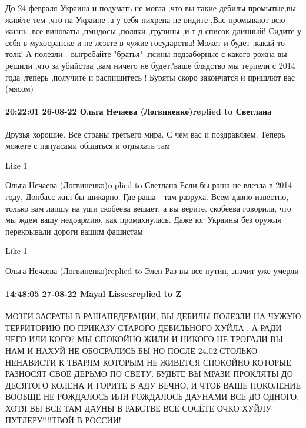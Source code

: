 До 24 февраля Украина и подумать не могла ,что вы такие дебилы промытые,вы
живёте тем ,что на Украине ,а у себя нихрена не видите ,Вас промывают всю жизнь
,все виноваты ,пмндосы ,поляки ,грузины ,и т д список длинный! Сидите у себя в
мухосранске и не лезьте в чужие государства! Может и будет ,какай то толк! А
полезли - выгребайте "братья" ,псины подзаборные с какого рожна вы решили ,что
за убийства ,вам ничего не будет?ваше блядство мы терпели с 2014 года ,теперь
,получите и распишитесь ! Буряты скоро закончатся и пришлют вас (мясом)


\paragraph{20:22:01 26-08-22 Ольга Нечаева (Логвиненко)replied to Светлана}

Друзья хорошие. Все страны третьего мира. С чем вас и поздравляем. Теперь
можете с папуасами общаться и отдыхать там

    Like 1

Ольга Нечаева (Логвиненко)replied to Светлана
Если бы раша не влезла в 2014 году, Донбасс жил бы шикарно. Где раша - там разруха. Всем давно известно, только вам лапшу на уши скобеева вешает, а вы верите. скобеева говорила, что мы ждем вашу недоармию, как промахнулась. Даже юг Украины без оружия перекрывали дороги вашим фашистам

    Like 1

Ольга Нечаева (Логвиненко)replied to Элен
Раз вы все путин, значит уже умерли

\paragraph{14:48:05 27-08-22 Mayal Lissesreplied to Z}

МОЗГИ ЗАСРАТЫ В РАШАПЕДЕРАЦИИ, ВЫ ДЕБИЛЫ ПОЛЕЗЛИ НА ЧУЖУЮ ТЕРРИТОРИЮ ПО ПРИКАЗУ
СТАРОГО ДЕБИЛЬНОГО ХУЙЛА , А РАДИ ЧЕГО ИЛИ КОГО? МЫ СПОКОЙНО ЖИЛИ И НИКОГО НЕ
ТРОГАЛИ ВЫ НАМ И НАХУЙ НЕ ОБОСРАЛИСЬ БЫ НО ПОСЛЕ 24.02 СТОЛЬКО НЕНАВИСТИ К
ТВАРЯМ КОТОРЫМ НЕ ЖИВЁТСЯ СПОКОЙНО КОТОРЫЕ РАЗНОСЯТ СВОЁ ДЕРЬМО ПО СВЕТУ.
БУДЬТЕ ВЫ МРАЗИ ПРОКЛЯТЫ ДО ДЕСЯТОГО КОЛЕНА И ГОРИТЕ В АДУ ВЕЧНО, И ЧТОБ ВАШЕ
ПОКОЛЕНИЕ ВООБЩЕ НЕ РОЖДАЛОСЬ ИЛИ РОЖДАЛОСЬ ДАУНАМИ ВСЕ ДО ОДНОГО, ХОТЯ ВЫ ВСЕ
ТАМ ДАУНЫ В РАБСТВЕ ВСЕ СОСЁТЕ ОЧКО ХУЙЛУ ПУТЛЕРУ!!!!ТВОЙ В РОССИИ!



